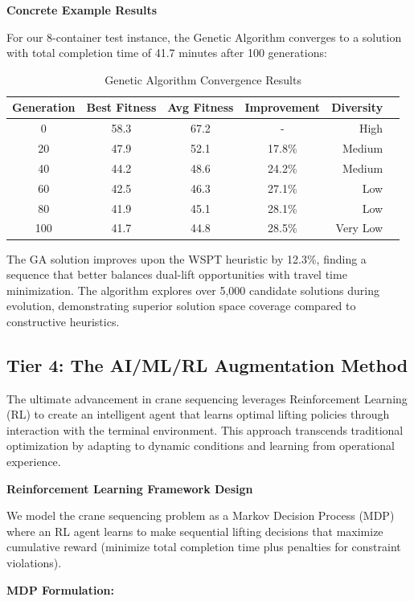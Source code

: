 \documentclass{article}
\begin{document}
\textbf{Concrete Example Results}

For our 8-container test instance, the Genetic Algorithm converges to a solution with total completion time of 41.7 minutes after 100 generations:

\begin{table}[htbp]
\centering
\begin{tabular}{@{}ccccrr@{}}
\toprule
\textbf{Generation} & \textbf{Best Fitness} & \textbf{Avg Fitness} & \textbf{Improvement} & \textbf{Diversity} \\
\midrule
0 & 58.3 & 67.2 & - & High \\
20 & 47.9 & 52.1 & 17.8\% & Medium \\
40 & 44.2 & 48.6 & 24.2\% & Medium \\
60 & 42.5 & 46.3 & 27.1\% & Low \\
80 & 41.9 & 45.1 & 28.1\% & Low \\
100 & 41.7 & 44.8 & 28.5\% & Very Low \\
\bottomrule
\end{tabular}
\caption{Genetic Algorithm Convergence Results}
\end{table}

The GA solution improves upon the WSPT heuristic by 12.3\%, finding a sequence that better balances dual-lift opportunities with travel time minimization. The algorithm explores over 5,000 candidate solutions during evolution, demonstrating superior solution space coverage compared to constructive heuristics.

\subsection{Tier 4: The AI/ML/RL Augmentation Method}

The ultimate advancement in crane sequencing leverages Reinforcement Learning (RL) to create an intelligent agent that learns optimal lifting policies through interaction with the terminal environment. This approach transcends traditional optimization by adapting to dynamic conditions and learning from operational experience.

\textbf{Reinforcement Learning Framework Design}

We model the crane sequencing problem as a Markov Decision Process (MDP) where an RL agent learns to make sequential lifting decisions that maximize cumulative reward (minimize total completion time plus penalties for constraint violations).

\textbf{MDP Formulation:}
\end{document}
